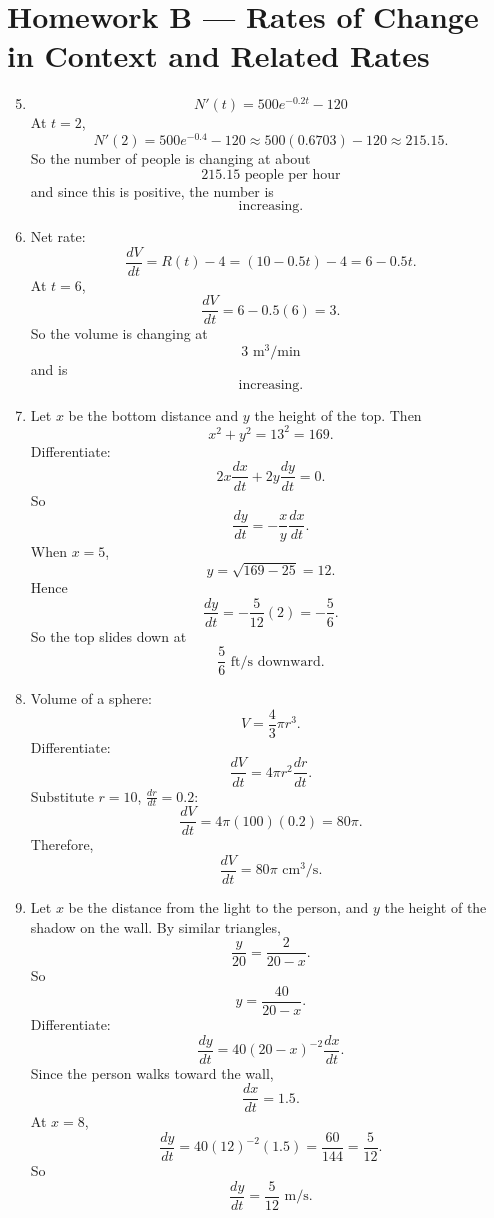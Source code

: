 \documentclass[11pt]{article}
\begin{document}
\bigskip

\section*{Homework B --- Rates of Change in Context and Related Rates}

\begin{enumerate}
    \setcounter{enumi}{4}

    \item 
    \[
    N'(t)=500e^{-0.2t}-120
    \]
    At \(t=2\),
    \[
    N'(2)=500e^{-0.4}-120\approx 500(0.6703)-120\approx 215.15.
    \]
    So the number of people is changing at about
    \[
    \boxed{215.15\text{ people per hour}}
    \]
    and since this is positive, the number is
    \[
    \boxed{\text{increasing}.}
    \]

    \item 
    Net rate:
    \[
    \frac{dV}{dt}=R(t)-4=(10-0.5t)-4=6-0.5t.
    \]
    At \(t=6\),
    \[
    \frac{dV}{dt}=6-0.5(6)=3.
    \]
    So the volume is changing at
    \[
    \boxed{3\text{ m}^3/\text{min}}
    \]
    and is
    \[
    \boxed{\text{increasing}.}
    \]

    \item 
    Let \(x\) be the bottom distance and \(y\) the height of the top. Then
    \[
    x^2+y^2=13^2=169.
    \]
    Differentiate:
    \[
    2x\frac{dx}{dt}+2y\frac{dy}{dt}=0.
    \]
    So
    \[
    \frac{dy}{dt}=-\frac{x}{y}\frac{dx}{dt}.
    \]
    When \(x=5\),
    \[
    y=\sqrt{169-25}=12.
    \]
    Hence
    \[
    \frac{dy}{dt}=-\frac{5}{12}(2)=-\frac{5}{6}.
    \]
    So the top slides down at
    \[
    \boxed{\frac56\text{ ft/s downward}.}
    \]

    \item 
    Volume of a sphere:
    \[
    V=\frac43\pi r^3.
    \]
    Differentiate:
    \[
    \frac{dV}{dt}=4\pi r^2\frac{dr}{dt}.
    \]
    Substitute \(r=10\), \(\frac{dr}{dt}=0.2\):
    \[
    \frac{dV}{dt}=4\pi(100)(0.2)=80\pi.
    \]
    Therefore,
    \[
    \boxed{\frac{dV}{dt}=80\pi\text{ cm}^3/\text{s}.}
    \]

    \item 
    Let \(x\) be the distance from the light to the person, and \(y\) the height of the shadow on the wall.  
    By similar triangles,
    \[
    \frac{y}{20}=\frac{2}{20-x}.
    \]
    So
    \[
    y=\frac{40}{20-x}.
    \]
    Differentiate:
    \[
    \frac{dy}{dt}=40(20-x)^{-2}\frac{dx}{dt}.
    \]
    Since the person walks toward the wall,
    \[
    \frac{dx}{dt}=1.5.
    \]
    At \(x=8\),
    \[
    \frac{dy}{dt}=40(12)^{-2}(1.5)=\frac{60}{144}=\frac{5}{12}.
    \]
    So
    \[
    \boxed{\frac{dy}{dt}=\frac{5}{12}\text{ m/s}.}
    \]


\end{enumerate}
\end{document}
